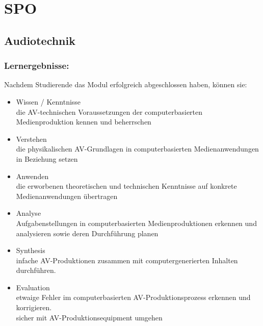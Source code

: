 \section{SPO}
    \subsection{Audiotechnik}
        \subsubsection{Lernergebnisse:}
        Nachdem Studierende das Modul erfolgreich abgeschlossen haben, können sie:

        \begin{itemize}
            \item Wissen / Kenntnisse\\
                die AV-technischen Voraussetzungen der computerbasierten Medienproduktion kennen und beherrschen
            \item Verstehen\\
                die physikalischen AV-Grundlagen in computerbasierten Medienanwendungen in Beziehung setzen
            \item Anwenden\\
                die erworbenen theoretischen und technischen Kenntnisse auf konkrete Medienanwendungen übertragen
            \item Analyse\\
                Aufgabenstellungen in computerbasierten Medienproduktionen erkennen und analysieren sowie deren Durchführung planen
            \item Synthesis\\
                infache AV-Produktionen zusammen mit computergenerierten Inhalten durchführen.
            \item Evaluation\\
            etwaige Fehler im computerbasierten AV-Produktionsprozess erkennen und korrigieren.\\
            sicher mit AV-Produktionsequipment umgehen
        \end{itemize}
\newpage